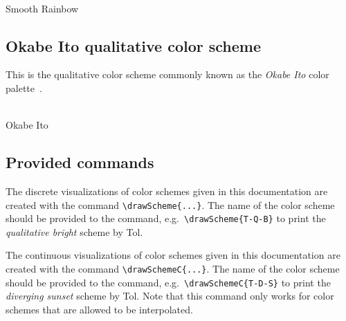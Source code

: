 \documentclass{scrartcl}
\newcommand\marg[1]{\leavevmode\marginpar{\raggedleft #1}}
\begin{document}
\begin{center}
    \\
    Smooth Rainbow\\
\end{center}

\subsection{Okabe Ito qualitative color scheme}\label{sec:OkabeIto}
This is the qualitative color scheme commonly known as the \emph{Okabe Ito} color palette~\cite{Ichihara_2008}.

\begin{center}
    \\
    Okabe Ito
\end{center}

\subsection{Provided commands}
\cprotect\marg{\verb!\drawScheme{...}!}%
The discrete visualizations of color schemes given in this documentation are created with the command \verb!\drawScheme{...}!.
The name of the color scheme should be provided to the command, e.g.\ \verb!\drawScheme{T-Q-B}! to print the \emph{qualitative bright} scheme by Tol.

\cprotect\marg{\verb!\drawSchemeC{...}!}%
The continuous visualizations of color schemes given in this documentation are created with the command \verb!\drawSchemeC{...}!.
The name of the color scheme should be provided to the command, e.g.\ \verb!\drawSchemeC{T-D-S}! to print the \emph{diverging sunset} scheme by Tol.
Note that this command only works for color schemes that are allowed to be interpolated.

\clearpage
\printbibliography
\end{document}

